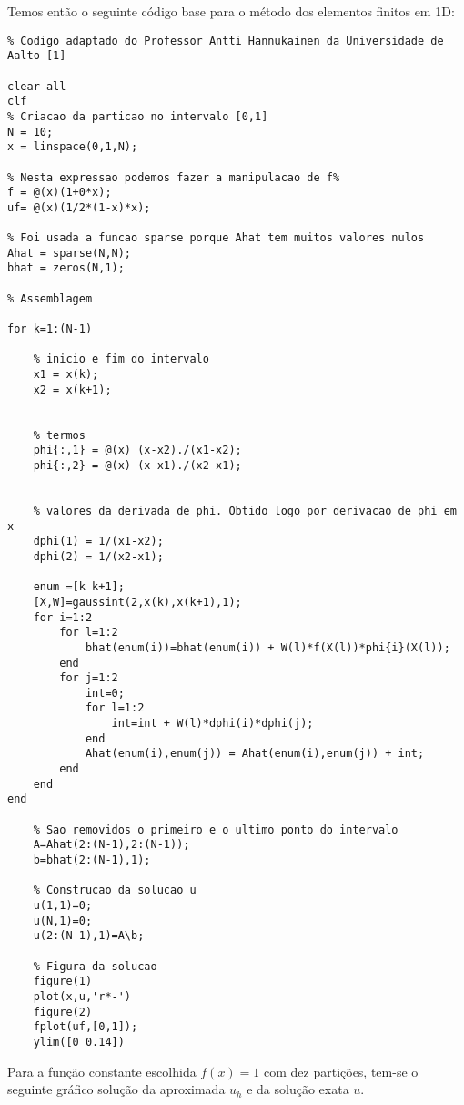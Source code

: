 \documentclass{article}
\theoremstyle{definition}
\theoremstyle{plain}
\numberwithin{equation}{section}
\begin{document}
\vspace{5mm}

Temos então o seguinte código base para o método dos elementos finitos em 1D:

\vspace{5mm}

\begin{lstlisting}[frame=single]
% Codigo adaptado do Professor Antti Hannukainen da Universidade de Aalto [1]
% Codigo adaptado do Professor Antti Hannukainen da Universidade de Aalto [1]

clear all
clf
% Criacao da particao no intervalo [0,1]
N = 10;
x = linspace(0,1,N);

% Nesta expressao podemos fazer a manipulacao de f%
f = @(x)(1+0*x);
uf= @(x)(1/2*(1-x)*x);

% Foi usada a funcao sparse porque Ahat tem muitos valores nulos
Ahat = sparse(N,N);
bhat = zeros(N,1);

% Assemblagem

for k=1:(N-1)
    
    % inicio e fim do intervalo
    x1 = x(k);
    x2 = x(k+1);
    
    
    % termos
    phi{:,1} = @(x) (x-x2)./(x1-x2);
    phi{:,2} = @(x) (x-x1)./(x2-x1);


    % valores da derivada de phi. Obtido logo por derivacao de phi em x
    dphi(1) = 1/(x1-x2);
    dphi(2) = 1/(x2-x1);
    
    enum =[k k+1];
    [X,W]=gaussint(2,x(k),x(k+1),1);
    for i=1:2
        for l=1:2
            bhat(enum(i))=bhat(enum(i)) + W(l)*f(X(l))*phi{i}(X(l));
        end
        for j=1:2
            int=0;
            for l=1:2
                int=int + W(l)*dphi(i)*dphi(j);
            end
            Ahat(enum(i),enum(j)) = Ahat(enum(i),enum(j)) + int;
        end
    end
end

    % Sao removidos o primeiro e o ultimo ponto do intervalo
    A=Ahat(2:(N-1),2:(N-1));
    b=bhat(2:(N-1),1);
    
    % Construcao da solucao u
    u(1,1)=0;
    u(N,1)=0;
    u(2:(N-1),1)=A\b;
    
    % Figura da solucao
    figure(1)
    plot(x,u,'r*-')
    figure(2)
    fplot(uf,[0,1]);
    ylim([0 0.14])
\end{lstlisting}

\vspace{5mm}

Para a função constante escolhida  $f(x)=1$ com dez partições, tem-se o seguinte gráfico solução da aproximada $u_h$ e da solução exata $u$.
\end{document}
